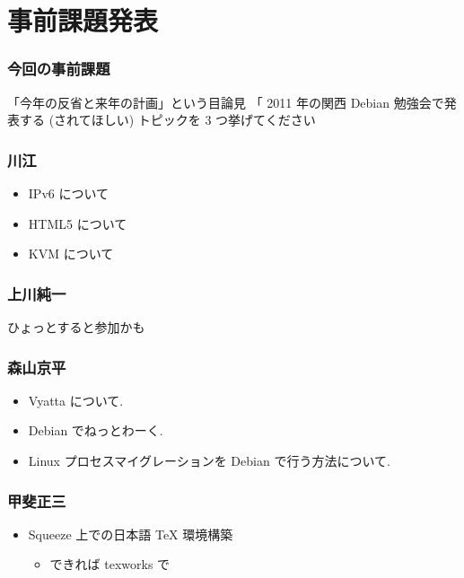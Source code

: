 \documentclass[cjk,dvipdfmx,12pt,%
hyperref={bookmarks=true,bookmarksnumbered=true,bookmarksopen=false,%
colorlinks=false,%
pdftitle={第 42 回 関西 Debian 勉強会},%
pdfauthor={倉敷・のがた・佐々木},%
pdfsubject={資料},%
}]{beamer}
\begin{document}
\section{事前課題発表}




\begin{frame}[fragile]
\frametitle{今回の事前課題}


\begin{block}{「今年の反省と来年の計画」という目論見}
「 2011 年の関西 Debian 勉強会で発表する (されてほしい) トピックを 3 つ挙げてください
\end{block}


\end{frame}




\begin{frame}[fragile]
\frametitle{川江}

\begin{itemize}
\item IPv6 について
\item HTML5 について
\item KVM について
\end{itemize}

\end{frame}

\begin{frame}[fragile]
\frametitle{ 上川純一 }

ひょっとすると参加かも

\end{frame}

\begin{frame}[fragile]
\frametitle{ 森山京平 }

\begin{itemize}
\item Vyatta について.
\item Debian でねっとわーく.
\item Linux プロセスマイグレーションを Debian で行う方法について.
\end{itemize}

\end{frame}

\begin{frame}[fragile]
\frametitle{ 甲斐正三 }

\begin{itemize}
\item Squeeze 上での日本語 TeX 環境構築

\begin{itemize}
\item できれば texworks で
\end{itemize}
\end{itemize}

\end{frame}
\end{document}
